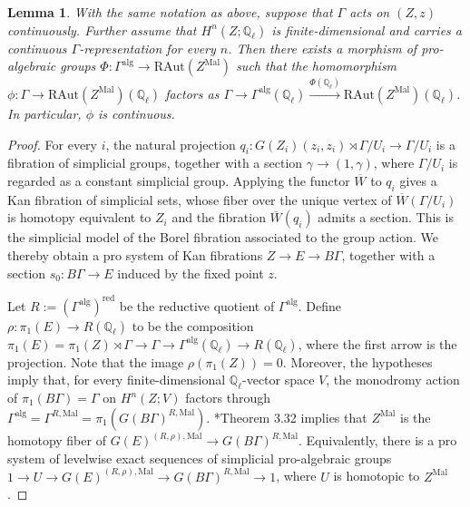 \documentclass[11pt]{amsart}
\newtheorem{lemma}[theorem]{Lemma}
\theoremstyle{definition}
\numberwithin{equation}{section}
\numberwithin{equation}{section}
\newcommand\QQ{\mathbb{Q}}
\begin{document}
\begin{lemma}\label{Lem: continuity on relative algebraic homotopy type}
With the same notation as above, suppose that $\Gamma$ acts on $(Z,z)$ continuously. Further assume that $H^n(Z;\QQ_{\ell})$ is finite-dimensional and carries a continuous $\Gamma$-representation for every $n$. Then there exists a morphism of pro-algebraic groups $\Phi:\Gamma^{\mathrm{alg}}\rightarrow \mathrm{RAut}(Z^{\mathrm{Mal}})$ such that the homomorphism $\phi: \Gamma\rightarrow \mathrm{RAut}(Z^{\mathrm{Mal}})(\QQ_{\ell})$ factors as $\Gamma\rightarrow \Gamma^{\mathrm{alg}}(\QQ_{\ell})\xrightarrow{\Phi(\QQ_{\ell})} \mathrm{RAut}(Z^{\mathrm{Mal}})(\QQ_{\ell})$. In particular, $\phi$ is continuous.
\end{lemma}

\begin{proof}
For every $i$, the natural projection $q_i:G(Z_i)(z_i,z_i)\rtimes \Gamma/U_i\rightarrow \Gamma/U_i$ is a fibration of simplicial groups, together with a section $\gamma\rightarrow (1,\gamma)$, where $\Gamma/U_i$ is regarded as a constant simplicial group. Applying the functor $\overline{W}$ to $q_i$ gives a Kan fibration of simplicial sets, whose fiber over the unique vertex of $\overline{W}(\Gamma/U_i)$ is homotopy equivalent to $Z_i$ and the fibration $\overline{W}(q_i)$ admits a section. This is the simplicial model of the Borel fibration associated to the group action. We thereby obtain a pro system of Kan fibrations $Z\rightarrow E\rightarrow B\Gamma$, together with a section $s_0:B\Gamma\rightarrow E$ induced by the fixed point $z$.

Let $R:=(\Gamma^{\mathrm{alg}})^{\mathrm{red}}$ be the reductive quotient of $\Gamma^{\mathrm{alg}}$. Define $\rho:\pi_1(E)\rightarrow R(\QQ_{\ell})$ to be the composition $\pi_1(E)=\pi_1(Z)\rtimes \Gamma\rightarrow \Gamma\rightarrow \Gamma^{\mathrm{alg}}(\QQ_{\ell})\rightarrow R(\QQ_{\ell})$, where the first arrow is the projection. Note that the image $\rho(\pi_1(Z))=0$. Moreover, the hypotheses imply that, for every finite-dimensional $\QQ_{\ell}$-vector space $V$, the monodromy action of $\pi_1(B\Gamma)=\Gamma$ on $H^n(Z;V)$ factors through $\Gamma^{\mathrm{alg}}=\Gamma^{R,\mathrm{Mal}}=\pi_1(G(B\Gamma)^{R,\mathrm{Mal}})$. \cite{Pridham-Galois-actions-on-homotopy-groups-algebraic-varieties}*{Theorem 3.32} implies that $Z^{\mathrm{Mal}}$ is the homotopy fiber of $G(E)^{(R,\rho),\mathrm{Mal}}\rightarrow G(B\Gamma)^{R,\mathrm{Mal}}$. Equivalently, there is a pro system of levelwise exact sequences of simplicial pro-algebraic groups $1\rightarrow U\rightarrow G(E)^{(R,\rho),\mathrm{Mal}}\rightarrow G(B\Gamma)^{R,\mathrm{Mal}}\rightarrow 1$, where $U$ is homotopic to $Z^{\mathrm{Mal}}$. 


\end{proof}
\end{document}

